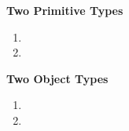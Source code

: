 \documentclass[11pt]{report}
\begin{document}
\begin{enumerate}
  {\bf Two Primitive Types}
  \begin{enumerate}
  \setlength{\itemsep}{.75in}
    \item 
    \item 
  \end{enumerate}

  \vspace*{1in}
  {\bf Two Object Types}
  \begin{enumerate}
  \setlength{\itemsep}{.75in}
    \item 
    \item 
  \end{enumerate}

      
      
      
      
      
      
      
      
      
      
      
   


\end{enumerate}
 
\end{document}
